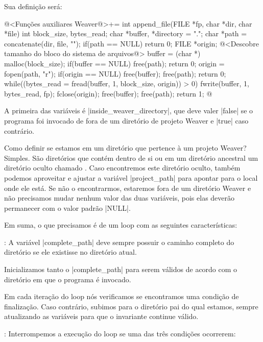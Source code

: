 {Sua definição será:

\iniciocodigo
@<Funções auxiliares Weaver@>+=
int append_file(FILE *fp, char *dir, char *file){
  int block_size, bytes_read;
  char *buffer, *directory = ".";
  char *path = concatenate(dir, file, "");
  if(path == NULL) return 0;
  FILE *origin;
  @<Descobre tamanho do bloco do sistema de arquivos@>
  buffer = (char *) malloc(block_size);
  if(buffer == NULL){
    free(path);
    return 0;
  }
  origin = fopen(path, "r");
  if(origin == NULL){
    free(buffer);
    free(path);
    return 0;
  }
  while((bytes_read = fread(buffer, 1, block_size, origin)) > 0){
    fwrite(buffer, 1, bytes_read, fp);
  }
  fclose(origin);
  free(buffer);
  free(path);
  return 1;
}
@
\fimcodigo



A primeira das variáveis é |inside_weaver_directory|, que deve valer
|false| se o programa foi invocado de fora de um diretório de projeto
Weaver e |true| caso contrário.

Como definir se estamos em um diretório que pertence à um projeto
Weaver? Simples. São diretórios que contém dentro de si ou em um
diretório ancestral um diretório oculto
chamado . Caso encontremos este diretório oculto,
também podemos aproveitar e ajustar a variável |project_path| para
apontar para o local onde ele está. Se não o encontrarmos, estaremos
fora de um diretório Weaver e não precisamos mudar nenhum valor das
duas variáveis, pois elas deverão permanecer com o valor padrão
|NULL|.

Em suma, o que precisamos é de um loop com as seguintes
características:

: A variável |complete_path| deve sempre
  possuir o caminho completo do diretório  se ele
  existisse no diretório atual.

 Inicializamos tanto o |complete_path|
  para serem válidos de acordo com o diretório em que o programa é
  invocado.

 Em cada iteração do loop nós verificamos se
  encontramos uma condição de finalização. Caso contrário, subimos
  para o diretório pai do qual estamos, sempre atualizando as
  variáveis para que o invariante continue válido.

: Interrompemos a execução do loop se uma das
  três condições ocorrerem:

}
